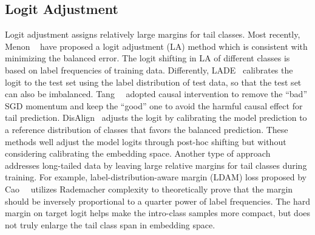 \documentclass[10pt,twocolumn,letterpaper]{article}
\begin{document}
\subsection{Logit Adjustment}
Logit adjustment assigns relatively large margins for tail classes. Most recently, Menon \etal~\cite{adjustment21} have proposed a logit adjustment (LA) method which is consistent with minimizing the balanced error. The logit shifting in LA of different classes is based on label frequencies of training data. Differently, LADE~\cite{Hong2021CVPR} calibrates the logit to the test set using the label distribution of test data, so that the test set can also be imbalanced. Tang~\etal~\cite{De-confound-TDE20} adopted causal intervention to remove the ``bad'' SGD momentum and keep the ``good'' one to avoid the harmful causal effect for tail prediction. DisAlign~\cite{DisAli21} adjusts the logit by calibrating the model prediction to a reference distribution of classes that favors the balanced prediction. These methods well adjust the model logits through post-hoc shifting but without considering calibrating the embedding space. Another type of approach~\cite{Kaidi2019, Cao2020CVPR} addresses long-tailed data by leaving large relative margins for tail classes during training. For example, label-distribution-aware margin (LDAM) loss proposed by Cao~\etal~\cite{Kaidi2019} utilizes Rademacher complexity to theoretically prove that the margin should be inversely proportional to a quarter power of label frequencies. The hard margin on target logit helps make the intro-class samples more compact, but does not truly enlarge the tail class span in embedding space.
\end{document}
